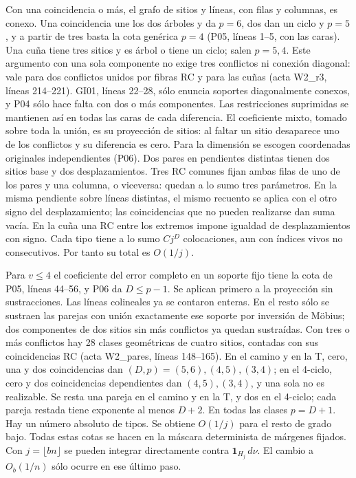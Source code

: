 Con una coincidencia o más, el grafo de sitios y líneas, con filas y columnas, es conexo.
Una coincidencia une los dos árboles y da $p=6$, dos dan un ciclo y $p=5$,
y a partir de tres basta la cota genérica $p=4$ (P05, líneas 1--5, con las caras).
Una cuña tiene tres sitios y es árbol o tiene un ciclo; salen $p=5,4$.
Este argumento con una sola componente no exige tres conflictos ni conexión diagonal:
vale para dos conflictos unidos por fibras RC y para las cuñas (acta W2\_r3, líneas 214--221).
GI01, líneas 22--28, sólo enuncia soportes diagonalmente conexos, y P04 sólo hace falta
con dos o más componentes.
Las restricciones suprimidas se mantienen así en todas las caras de cada diferencia.
El coeficiente mixto, tomado sobre toda la unión, es su proyección de sitios:
al faltar un sitio desaparece uno de los conflictos y su diferencia es cero.
Para la dimensión se escogen coordenadas originales independientes (P06).
Dos pares en pendientes distintas tienen dos sitios base y dos desplazamientos.
Tres RC comunes fijan ambas filas de uno de los pares y una columna, o viceversa:
quedan a lo sumo tres parámetros. En la misma pendiente sobre líneas distintas,
el mismo recuento se aplica con el otro signo del desplazamiento; las coincidencias
que no pueden realizarse dan suma vacía. En la cuña una RC entre los extremos
impone igualdad de desplazamientos con signo. Cada tipo tiene a lo sumo $Cj^D$
colocaciones, aun con índices vivos no consecutivos. Por tanto su total es $O(1/j)$.

Para $v\le4$ el coeficiente del error completo en un soporte fijo tiene la cota
de P05, líneas 44--56, y P06 da $D\le p-1$. Se aplican primero a la proyección
sin sustracciones. Las líneas colineales ya se contaron enteras. En el resto sólo
se sustraen las parejas con unión exactamente ese soporte por inversión de Möbius;
dos componentes de dos sitios sin más conflictos ya quedan sustraídas.
Con tres o más conflictos hay 28 clases geométricas de cuatro sitios, contadas con sus
coincidencias RC (acta W2\_pares, líneas 148--165). En el camino y en la T,
cero, una y dos coincidencias dan $(D,p)=(5,6),(4,5),(3,4)$; en el 4-ciclo, cero y dos
coincidencias dependientes dan $(4,5),(3,4)$, y una sola no es realizable.
Se resta una pareja en el camino y en la T, y dos en el 4-ciclo; cada pareja restada
tiene exponente al menos $D+2$. En todas las clases $p=D+1$.
Hay un número absoluto de tipos. Se obtiene $O(1/j)$ para el resto de grado bajo.
Todas estas cotas se hacen en la máscara determinista de márgenes fijados.
Con $j=\lfloor bn\rfloor$ se pueden integrar directamente contra
$\mathbf1_{H_j}\,d\nu$. El cambio a $O_b(1/n)$ sólo ocurre en ese último paso.
